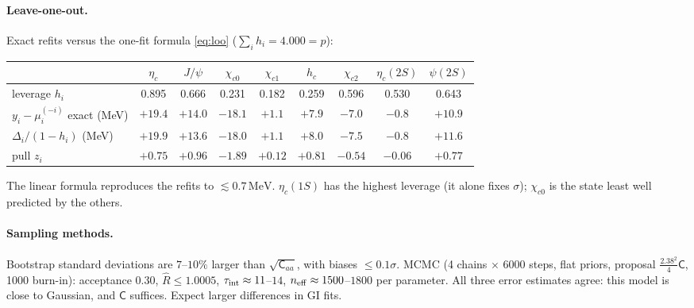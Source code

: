 \documentclass[11pt,a4paper]{article}
\numberwithin{equation}{section}
\theoremstyle{definition}
\theoremstyle{plain}
\theoremstyle{remark}
\numberwithin{algorithm}{section}
\newcommand{\MeV}{\,\mathrm{MeV}}
\newcommand{\sC}{\mathsf C}
\begin{document}
\paragraph{Leave-one-out.} Exact refits versus the one-fit formula \eqref{eq:loo} ($\sum_ih_i=4.000=p$):
\begin{center}\small
\begin{tabular}{@{}lcccccccc@{}}\toprule
 & $\eta_c$ & $J/\psi$ & $\chi_{c0}$ & $\chi_{c1}$ & $h_c$ & $\chi_{c2}$ & $\eta_c(2S)$ & $\psi(2S)$\\\midrule
leverage $h_i$ & 0.895 & 0.666 & 0.231 & 0.182 & 0.259 & 0.596 & 0.530 & 0.643\\
$y_i-\mu_i^{(-i)}$ exact (MeV) & $+19.4$ & $+14.0$ & $-18.1$ & $+1.1$ & $+7.9$ & $-7.0$ & $-0.8$ & $+10.9$\\
$\Delta_i/(1-h_i)$ (MeV) & $+19.9$ & $+13.6$ & $-18.0$ & $+1.1$ & $+8.0$ & $-7.5$ & $-0.8$ & $+11.6$\\
pull $z_i$ & $+0.75$ & $+0.96$ & $-1.89$ & $+0.12$ & $+0.81$ & $-0.54$ & $-0.06$ & $+0.77$\\\bottomrule
\end{tabular}
\end{center}
The linear formula reproduces the refits to $\lesssim0.7\MeV$. $\eta_c(1S)$ has the highest leverage (it alone fixes $\sigma$); $\chi_{c0}$ is the state least well predicted by the others.

\paragraph{Sampling methods.} Bootstrap standard deviations are $7$--$10\%$ larger than $\sqrt{\sC_{aa}}$, with biases $\le0.1\sigma$. MCMC (4 chains $\times$ 6000 steps, flat priors, proposal $\frac{2.38^2}{4}\sC$, 1000 burn-in): acceptance $0.30$, $\hat R\le1.0005$, $\tau_{\rm int}\approx11$--$14$, $n_{\rm eff}\approx1500$--$1800$ per parameter. All three error estimates agree: this model is close to Gaussian, and $\sC$ suffices. Expect larger differences in GI fits.
\end{document}

